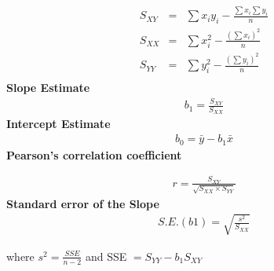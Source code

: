 

\begin{eqnarray*}
	S_{XY} &=&
	\sum x_iy_i - \frac{\sum x_i\sum y_i}{n}\\
	S_{XX} &=&
	\sum x_i^2 - \frac{(\sum x_i)^2}{n}\\
	S_{YY} &=&
	\sum y_i^2 - \frac{(\sum y_i)^2}{n}\\
\end{eqnarray*}
{\bf Slope Estimate}
\begin{eqnarray*}
	b_1 = \frac{S_{XY}}{S_{XX}}
\end{eqnarray*}
{\bf Intercept Estimate}
\begin{eqnarray*}
	b_0 = \bar{y} -b_1\bar{x}
\end{eqnarray*}
{\bf Pearson's correlation coefficient}

\begin{eqnarray*}
	r = \frac{S_{XY}}{\sqrt{S_{XX} \times S_{YY}}}
\end{eqnarray*}
{\bf Standard error of the Slope}
\begin{eqnarray*}
	S.E.(b1) = \sqrt{\frac{s^2}{S_{XX}}}
\end{eqnarray*}

where $s^2 = \frac{SSE}{n-2}$
and SSE $= S_{YY} - b_1S_{XY}$
